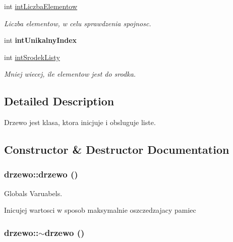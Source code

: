 \begin{DoxyCompactItemize}
\item 
\hypertarget{classdrzewo_a1be4229048eaebb61e07f955596fa27b}{
int \hyperlink{classdrzewo_a1be4229048eaebb61e07f955596fa27b}{intLiczbaElementow}}
\label{classdrzewo_a1be4229048eaebb61e07f955596fa27b}

\begin{DoxyCompactList}\small\item\em Liczba elementow, w celu sprawdzenia spojnosc. \item\end{DoxyCompactList}\item 
\hypertarget{classdrzewo_a15026b316679570014d43185bf92d317}{
int {\bfseries intUnikalnyIndex}}
\label{classdrzewo_a15026b316679570014d43185bf92d317}

\item 
\hypertarget{classdrzewo_aa1e5d533332e767d70b7feab0f506b0b}{
int \hyperlink{classdrzewo_aa1e5d533332e767d70b7feab0f506b0b}{intSrodekListy}}
\label{classdrzewo_aa1e5d533332e767d70b7feab0f506b0b}

\begin{DoxyCompactList}\small\item\em Mniej wiecej, ile elementow jest do srodka. \item\end{DoxyCompactList}\end{DoxyCompactItemize}


\subsection{Detailed Description}
Drzewo jest klasa, ktora inicjuje i obsluguje liste. 

\subsection{Constructor \& Destructor Documentation}
\hypertarget{classdrzewo_a555c14101f8c11cf9344ecf8f8cf87b0}{
\subsubsection[{drzewo}]{\setlength{\rightskip}{0pt plus 5cm}drzewo::drzewo ()}}
\label{classdrzewo_a555c14101f8c11cf9344ecf8f8cf87b0}


Globals Varuabels. 

Inicujej wartosci w sposob maksymalnie oszczedzajacy pamiec \hypertarget{classdrzewo_a5d91af876b63be1f89bd93c9e8745aa7}{
\subsubsection[{$\sim$drzewo}]{\setlength{\rightskip}{0pt plus 5cm}drzewo::$\sim$drzewo ()}}
\label{classdrzewo_a5d91af876b63be1f89bd93c9e8745aa7}


